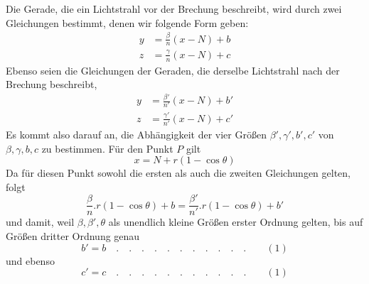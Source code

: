 Die Gerade, die ein Lichtstrahl vor der Brechung beschreibt, wird durch zwei Gleichungen bestimmt, denen wir folgende Form geben:
\[
\begin{aligned}
y&=\frac\beta n(x-N)+b\\
z&=\frac\gamma n(x-N)+c
\end{aligned}
\]
Ebenso seien die Gleichungen der Geraden, die derselbe Lichtstrahl nach der Brechung beschreibt,
\[
\begin{aligned}
y&=\frac{\beta'}{n'}(x-N)+b'\\
z&=\frac{\gamma'}{n'}(x-N)+c'
\end{aligned}
\]
Es kommt also darauf an, die Abhängigkeit der vier Größen $\beta',\gamma',b',c'$ von $\beta,\gamma,b,c$ zu bestimmen. Für den Punkt $P$ gilt
\[
x=N+r(1-\cos\theta)
\]
Da für diesen Punkt sowohl die ersten als auch die zweiten Gleichungen gelten, folgt
\[
\frac\beta n.r(1-\cos\theta)+b=\frac{\beta'}{n'}.r(1-\cos\theta)+b'
\]
und damit, weil $\beta,\beta',\theta$ als unendlich kleine Größen erster Ordnung gelten, bis auf Größen dritter Ordnung genau
\[
b'=b\quad .\quad .\quad .\quad .\quad .\quad .\quad .\quad .\quad .\quad .\quad .\qquad(1)
\]
und ebenso
\[
c'=c\quad .\quad .\quad .\quad .\quad .\quad .\quad .\quad .\quad .\quad .\quad .\qquad(1)
\]

